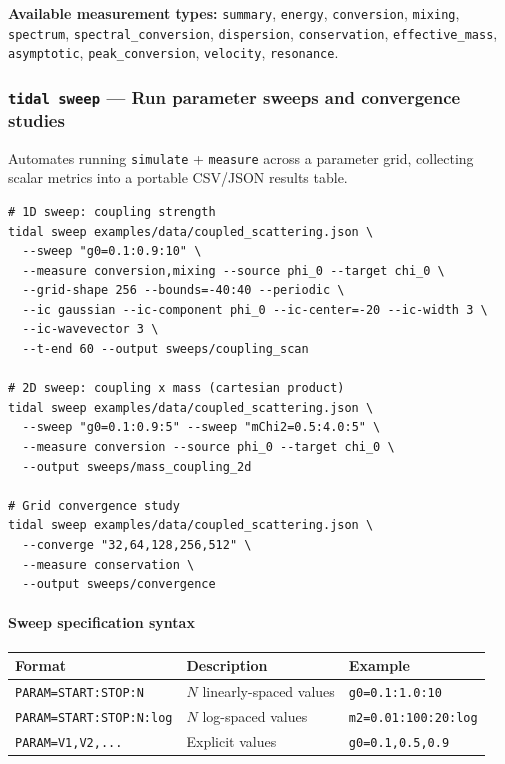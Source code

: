 \textbf{Available measurement types:} \texttt{summary}, \texttt{energy}, \texttt{conversion}, \texttt{mixing}, \texttt{spectrum}, \texttt{spectral\_conversion}, \texttt{dispersion}, \texttt{conservation}, \texttt{effective\_mass}, \texttt{asymptotic}, \texttt{peak\_conversion}, \texttt{velocity}, \texttt{resonance}.

\subsubsection{\texttt{tidal sweep} --- Run parameter sweeps and convergence studies}

Automates running \texttt{simulate} + \texttt{measure} across a parameter grid, collecting scalar metrics into a portable CSV/JSON results table.

\begin{lstlisting}[style=bash]
# 1D sweep: coupling strength
tidal sweep examples/data/coupled_scattering.json \
  --sweep "g0=0.1:0.9:10" \
  --measure conversion,mixing --source phi_0 --target chi_0 \
  --grid-shape 256 --bounds=-40:40 --periodic \
  --ic gaussian --ic-component phi_0 --ic-center=-20 --ic-width 3 \
  --ic-wavevector 3 \
  --t-end 60 --output sweeps/coupling_scan

# 2D sweep: coupling x mass (cartesian product)
tidal sweep examples/data/coupled_scattering.json \
  --sweep "g0=0.1:0.9:5" --sweep "mChi2=0.5:4.0:5" \
  --measure conversion --source phi_0 --target chi_0 \
  --output sweeps/mass_coupling_2d

# Grid convergence study
tidal sweep examples/data/coupled_scattering.json \
  --converge "32,64,128,256,512" \
  --measure conservation \
  --output sweeps/convergence
\end{lstlisting}

\paragraph{Sweep specification syntax}

\begin{table}[htbp]
\centering
\begin{tabular}{@{}lll@{}}
\toprule
Format & Description & Example \\
\midrule
\texttt{PARAM=START:STOP:N}       & $N$ linearly-spaced values & \texttt{g0=0.1:1.0:10} \\
\texttt{PARAM=START:STOP:N:log}   & $N$ log-spaced values      & \texttt{m2=0.01:100:20:log} \\
\texttt{PARAM=V1,V2,...}          & Explicit values            & \texttt{g0=0.1,0.5,0.9} \\
\bottomrule
\end{tabular}
\end{table}

